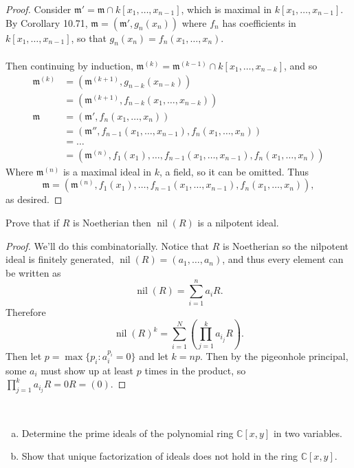 \documentclass{article}
\newenvironment{problem}[2][Problem]{\begin{trivlist}
\item[\hskip \labelsep {\bfseries #1}\hskip \labelsep {\bfseries #2.}]}{\end{trivlist}}
\newcommand{\set}[1]{\{ #1 \}}
\newcommand{\paren}[1]{\left( #1 \right)}
\begin{document}
\begin{proof}
  Consider $\mathfrak m' = \mathfrak m \cap k[x_1, \hdots, x_{n-1}]$, which is
  maximal in $k[x_1, \hdots, x_{n-1}]$. By Corollary 10.71,
  $\mathfrak m = (\mathfrak m', g_n(x_n))$ where $f_n$ has coefficients in
  $k[x_1, \hdots, x_{n-1}]$, so that $g_n(x_n) = f_n(x_1, \hdots, x_n)$.
  \\~\\
  Then continuing by induction,
  $\mathfrak m^{(k)} = \mathfrak m^{(k-1)} \cap k[x_1, \hdots, x_{n-k}]$, and so
  \begin{align*}
    \mathfrak m^{(k)}
    &= (\mathfrak m^{(k+1)}, g_{n-k}(x_{n-k})) \\
    &= (\mathfrak m^{(k+1)}, f_{n-k}(x_1, \hdots, x_{n-k})) \\
    \mathfrak m
    &= (\mathfrak m', f_n(x_1, \hdots, x_n)) \\
    &= (\mathfrak m'', f_{n-1}(x_1, \hdots, x_{n-1}), f_n(x_1, \hdots, x_n)) \\
    &= \hdots \\
    &= (\mathfrak m^{(n)}, f_{1}(x_1), \hdots, f_{n-1}(x_1, \hdots, x_{n-1}), f_n(x_1, \hdots, x_n))
  \end{align*}
  Where $\mathfrak m^{(n)}$ is a maximal ideal in $k$, a field, so it can be omitted. Thus \[
    \mathfrak m = (
      \mathfrak m^{(n)}, f_{1}(x_1),
      \hdots,
      f_{n-1}(x_1, \hdots, x_{n-1}),
      f_n(x_1, \hdots, x_n)
    ),
  \] as desired.
\end{proof}
\pagebreak
\begin{problem}{10.40 (Rotman)} %
  Prove that if $R$ is Noetherian then $\operatorname{nil}(R)$ is a nilpotent ideal.
\end{problem}

\begin{proof}
  We'll do this combinatorially. Notice that $R$ is Noetherian so the nilpotent
  ideal is finitely generated, $\operatorname{nil}(R) = (a_1, \hdots, a_n)$,
  and thus every element can be written as \[
    \operatorname{nil}(R) = \sum_{i=1}^n a_iR.
  \] Therefore \[
    \operatorname{nil}(R)^k = \sum_{i=1}^N \paren{\prod_{j=1}^k a_{i_j}R}.
  \]
  Then let $p = \max\set{p_i : a_i^{p_i} = 0}$ and let $k = np$. Then by the
  pigeonhole principal, some $a_i$ must show up at least $p$ times in the
  product, so $\prod_{j=1}^k a_{i_j}R = 0R = (0)$.
\end{proof}
\pagebreak
\begin{problem}{4 (Artin)} ~
  \begin{enumerate}[(a)]
    \item Determine the prime ideals of the polynomial ring $\mathbb C[x, y]$ in two variables.
    \item Show that unique factorization of ideals does not hold in the ring $\mathbb C[x, y]$.
  \end{enumerate}
\end{problem}
\end{document}
